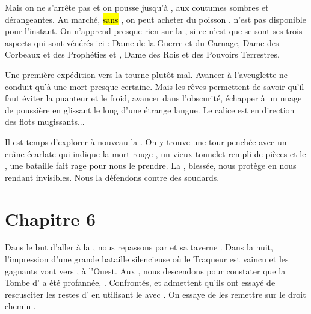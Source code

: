 \documentclass[11pt]{article}
\begin{document}
Mais on ne s'arrête pas et on pousse jusqu'à \nidcorbeaux{} , aux coutumes sombres et dérangeantes. Au marché, \hl{sans \arev{}}, on peut acheter du poisson . \mordred{} n'est pas disponible pour l'instant. On n'apprend presque rien sur la \tetemorrigan{}, si ce n'est que se sont ses trois aspects qui sont vénérés ici : \nemain{} Dame de la Guerre et du Carnage, \badb{} Dame des Corbeaux et des Prophéties et \macha{}, Dame des Rois et des Pouvoirs Terrestres.

Une première expédition vers la \adiante{} tourne plutôt mal. Avancer à l'aveuglette ne conduit qu'à une mort presque certaine. Mais les rêves permettent de savoir qu'il faut éviter la puanteur et le froid, avancer dans l'obscurité, échapper à un nuage de poussière en glissant le long d'une étrange langue. Le calice est en direction des flots mugissants...

Il est temps d'explorer à nouveau la \adiante{}. On y trouve une tour penchée avec un crâne écarlate qui indique la mort rouge , un vieux tonnelet rempli de pièces  et le \graal{} , une bataille fait rage pour nous le prendre. La \dame{}, blessée, nous protège en nous rendant invisibles. Nous la défendons contre des soudards. 



\section{Chapitre 6}

Dans le but d'aller à la \murmures{}, nous repassons par \faldorca{} et sa taverne . Dans la nuit, l'impression d'une grande bataille silencieuse où le Traqueur est vaincu et les gagnants vont vers \tuathan{}, à l'Ouest. Aux \tombesordre{}, nous descendons pour constater que la Tombe d'\arthur{} a été profannée, . Confrontés, \bedivere{} et \palamede{} admettent qu'ils ont essayé de rescusciter les restes d'\arthur{} en utilisant le \graal{} avec \neante{}. On essaye de les remettre sur le droit chemin .
\end{document}
